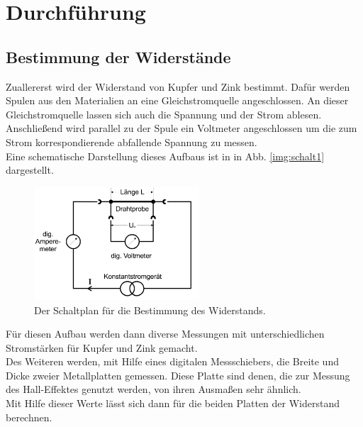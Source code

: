 \section{Durchführung}

\subsection{Bestimmung der Widerstände}
Zuallererst wird der Widerstand von Kupfer und Zink bestimmt. Dafür werden Spulen aus den Materialien an eine Gleichstromquelle angeschlossen.
An dieser Gleichstromquelle lassen sich auch die Spannung und der Strom ablesen.
Anschließend wird parallel zu der Spule ein Voltmeter angeschlossen um die zum Strom korrespondierende abfallende Spannung zu messen.\\
Eine schematische Darstellung dieses Aufbaus ist in in Abb. \ref{img:schalt1} dargestellt.
\begin{figure}[H]
    \centering
    \includegraphics[width=0.55\textwidth]{images/widerstandmessung.PNG}
    \caption{Der Schaltplan für die Bestimmung des Widerstands\protect \cite{V311}.}
    \label{img:hall}
  \end{figure}
\noindent
Für diesen Aufbau werden dann diverse Messungen mit unterschiedlichen Stromstärken für Kupfer und Zink gemacht.\\
Des Weiteren werden, mit Hilfe eines digitalen Messschiebers, die Breite und Dicke zweier Metallplatten gemessen. Diese Platte sind denen, die zur Messung des Hall-Effektes genutzt werden, 
von ihren Ausmaßen sehr ähnlich.\\
Mit Hilfe dieser Werte lässt sich dann für die beiden Platten der Widerstand berechnen.

